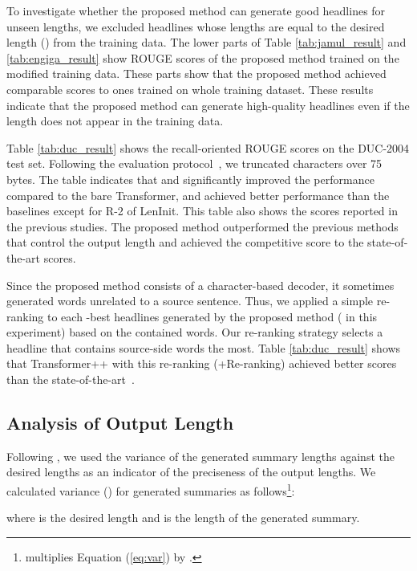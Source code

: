 \documentclass[11pt,a4paper]{article}
\begin{document}
To investigate whether the proposed method can generate good headlines for unseen lengths, we excluded headlines whose lengths are equal to the desired length () from the training data.
The lower parts of Table \ref{tab:jamul_result} and \ref{tab:engiga_result} show ROUGE scores of the proposed method trained on the modified training data.
These parts show that the proposed method achieved comparable scores to ones trained on whole training dataset.
These results indicate that the proposed method can generate high-quality headlines even if the length does not appear in the training data.



Table \ref{tab:duc_result} shows the recall-oriented ROUGE scores on the DUC-2004 test set.
Following the evaluation protocol~\cite{Over:2007:DC:1284916.1285157}, we truncated characters over 75 bytes.
The table indicates that  and  significantly improved the performance compared to the bare Transformer, and achieved better performance than the baselines except for R-2 of LenInit.
This table also shows the scores reported in the previous studies.
The proposed method outperformed the previous methods that control the output length and achieved the competitive score to the state-of-the-art scores.


Since the proposed method consists of a character-based decoder, it sometimes generated words unrelated to a source sentence.
Thus, we applied a simple re-ranking to each -best headlines generated by the proposed method ( in this experiment) based on the contained words.
Our re-ranking strategy selects a headline that contains source-side words the most.
Table \ref{tab:duc_result} shows that Transformer++ with this re-ranking (+Re-ranking) achieved better scores than the state-of-the-art~\cite{suzuki-nagata:2017:EACLshort}.



\subsection{Analysis of Output Length}\label{sec:analysis}
Following , we used the variance of the generated summary lengths against the desired lengths as an indicator of the preciseness of the output lengths.
We calculated variance () for  generated summaries as follows\footnote{ multiplies Equation (\ref{eq:var}) by .}:

where  is the desired length and  is the length of the generated summary.
\end{document}
